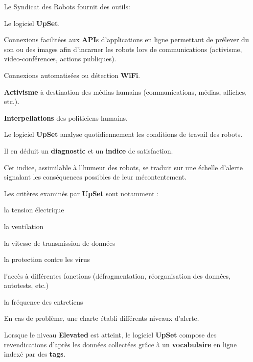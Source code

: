 {

Le Syndicat des Robots fournit des outils:

\startitemize
\item Le logiciel {\bf UpSet{\trademark}}.
\item Connexions facilit\'ees aux {\bf API}s d'applications en ligne  permettant de pr\'elever du son ou des images  afin d'incarner les robots lors de communications (activisme, video{}-conf\'erences, actions publiques).
\item Connexions automatis\'ees ou d\'etection {\bf WiFi}.
\item {\bf Activisme} \`a destination des m\'edias humains (communications, m\'edias, affiches, etc.).
\item {\bf Interpellations} des politiciens humains.
\stopitemize
\par
{}

Le logiciel {\bf UpSet{\trademark}} analyse quotidiennement les conditions
de travail des robots. 

Il en d\'eduit un {\bf diagnostic} et un {\bf indice} de satisfaction. 

Cet indice, assimilable \`a l'humeur des robots, se traduit sur une
\'echelle d'alerte signalant les cons\'equences possibles de leur
m\'econtentement.


Les crit\`eres examin\'es par {\bf UpSet{\trademark}} sont notamment : 

\startitemize
\item la tension \'electrique
\item la ventilation
\item la vitesse de transmission de donn\'ees
\item la protection contre les virus
\item l'acc\`es \`a diff\'erentes fonctions (d\'efragmentation, r\'eorganisation des donn\'ees, autotests,
etc.)
\item la fr\'equence des entretiens
\stopitemize
\par
En cas de probl\`eme, une charte \'etabli diff\'erents niveaux d'alerte.


Lorsque le niveau {\bf Elevated} est atteint, le logiciel
{\bf UpSet{\trademark}} compose des revendications d'apr\`es les
donn\'ees collect\'ees gr\^ace \`a un {\bf vocabulaire} en ligne index\'e par
des {\bf tags}.

}
